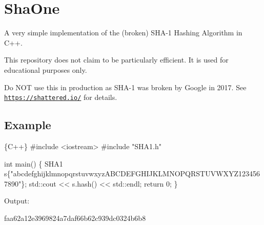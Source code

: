 \href{https://travis-ci.com/ptrstn/shaone}{\tt } \href{https://codedocs.xyz/ptrstn/shaone/}{\tt } \section*{Sha\+One}

A very simple implementation of the (broken) S\+H\+A-\/1 Hashing Algorithm in C++.

This repository does not claim to be particularly efficient. It is used for educational purposes only.

Do N\+OT use this in production as S\+H\+A-\/1 was broken by Google in 2017. See \href{https://shattered.io/}{\tt https\+://shattered.\+io/} for details.

\subsection*{Example}


\begin{DoxyCode}
\{C++\}
#include <iostream>
#include "SHA1.h"

int main() \{
    SHA1 s\{"abcdefghijklmnopqrstuvwxyzABCDEFGHIJKLMNOPQRSTUVWXYZ1234567890"\};
    std::cout << s.hash() << std::endl;
    return 0;
\}
\end{DoxyCode}


Output\+: 
\begin{DoxyCode}
faa62a12e3969824a7daf66b62c939dc0324b6b8
\end{DoxyCode}
 